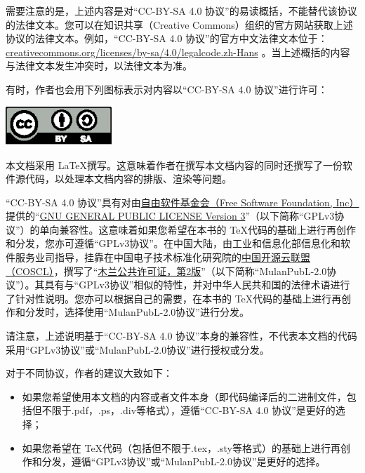 需要注意的是，上述内容是对“CC-BY-SA 4.0 协议”的易读概括，不能替代该协议的法律文本。您可以在知识共享（Creative Commons）组织的官方网站获取上述协议的法律文本。例如，“CC-BY-SA 4.0 协议”的官方中文法律文本位于：\href{https://creativecommons.org/licenses/by-sa/4.0/legalcode.zh-Hans}{creativecommons.org/licenses/by-sa/4.0/legalcode.zh-Hans} 。当上述概括的内容与法律文本发生冲突时，以法律文本为准。

有时，作者也会用下列图标表示对内容以“CC-BY-SA 4.0 协议”进行许可：

\begin{center}
    \includegraphics[width = 0.3\textwidth]{pic/CC-BY-SA/BY-SA.eps}
\end{center}

本文档采用 \LaTeX 撰写。这意味着作者在撰写本文档内容的同时还撰写了一份软件源代码，以处理本文档内容的排版、渲染等问题。

“CC-BY-SA 4.0 协议”具有对由\href{https://www.fsf.org/}{自由软件基金会（Free Software Foundation, Inc）}提供的“\href{https://www.gnu.org/licenses/gpl-3.0.html}{GNU GENERAL PUBLIC LICENSE Version 3}”（以下简称“GPLv3协议”）的单向兼容性。这意味着如果您希望在本书的 \TeX 代码的基础上进行再创作和分发，您亦可遵循“GPLv3协议”。在中国大陆，由工业和信息化部信息化和软件服务业司指导，挂靠在中国电子技术标准化研究院的\href{https://www.coscl.org.cn/}{中国开源云联盟（COSCL）}，撰写了“\href{https://license.coscl.org.cn/MulanPubL-2.0/index.html}{木兰公共许可证，第2版}”（以下简称“MulanPubL-2.0协议”）。其具有与“GPLv3协议”相似的特性，并对中华人民共和国的法律术语进行了针对性说明。您亦可以根据自己的需要，在本书的 \TeX 代码的基础上进行再创作和分发时，选择使用“MulanPubL-2.0协议”进行分发。

请注意，上述说明基于“CC-BY-SA 4.0 协议”本身的兼容性，不代表本文档的代码采用“GPLv3协议”或“MulanPubL-2.0协议”进行授权或分发。

对于不同协议，作者的建议大致如下：

\begin{itemize}
    \item 如果您希望使用本文档的内容或者文件本身（即代码编译后的二进制文件，包括但不限于.pdf，.ps，.div等格式），遵循“CC-BY-SA 4.0 协议”是更好的选择；
    
    \item 如果您希望在 \TeX 代码（包括但不限于.tex，.sty等格式）的基础上进行再创作和分发，遵循“GPLv3协议”或“MulanPubL-2.0协议”是更好的选择。
\end{itemize}

